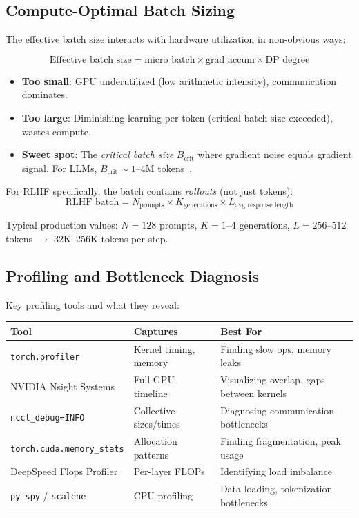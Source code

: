 \subsection{Compute-Optimal Batch Sizing}
\label{compute-optimal-batch-sizing}

The effective batch size interacts with hardware utilization in non-obvious ways:

\begin{equation}
\text{Effective batch size} = \text{micro\_batch} \times \text{grad\_accum} \times \text{DP degree}
\end{equation}

\begin{itemize}
  \item \textbf{Too small}: GPU underutilized (low arithmetic intensity), communication dominates.
  \item \textbf{Too large}: Diminishing learning per token (critical batch size exceeded), wastes compute.
  \item \textbf{Sweet spot}: The \emph{critical batch size} $B_\text{crit}$ where gradient noise equals gradient signal. For LLMs, $B_\text{crit} \sim 1$--$4$M tokens~\cite{mccandlish2018empirical}.
\end{itemize}

For RLHF specifically, the batch contains \emph{rollouts} (not just tokens): 
\begin{equation}
\text{RLHF batch} = N_\text{prompts} \times K_\text{generations} \times L_\text{avg response length}
\end{equation}

Typical production values: $N=128$ prompts, $K=1$--$4$ generations, $L=256$--$512$ tokens $\rightarrow$ 32K--256K tokens per step.

\subsection{Profiling and Bottleneck Diagnosis}
\label{profiling-and-bottleneck-diagnosis}

Key profiling tools and what they reveal:

\begin{tabular}{@{}lp{5cm}p{8cm}@{}}
\toprule
\textbf{Tool} & \textbf{Captures} & \textbf{Best For} \\
\midrule
\texttt{torch.profiler} & Kernel timing, memory & Finding slow ops, memory leaks \\
NVIDIA Nsight Systems & Full GPU timeline & Visualizing overlap, gaps between kernels \\
\texttt{nccl\_debug=INFO} & Collective sizes/times & Diagnosing communication bottlenecks \\
\texttt{torch.cuda.memory\_stats} & Allocation patterns & Finding fragmentation, peak usage \\
DeepSpeed Flops Profiler & Per-layer FLOPs & Identifying load imbalance \\
\texttt{py-spy} / \texttt{scalene} & CPU profiling & Data loading, tokenization bottlenecks \\
\bottomrule
\end{tabular}

